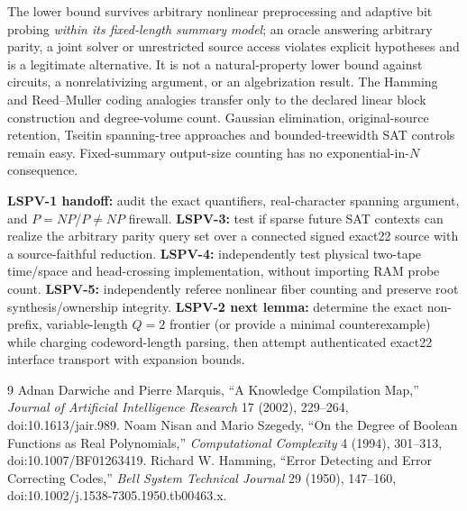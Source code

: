 \documentclass[10pt]{article}
\begin{document}
The lower bound survives arbitrary nonlinear preprocessing and adaptive bit probing \emph{within its fixed-length summary model}; an oracle answering arbitrary parity, a joint solver or unrestricted source access violates explicit hypotheses and is a legitimate alternative. It is not a natural-property lower bound against circuits, a nonrelativizing argument, or an algebrization result. The Hamming and Reed--Muller coding analogies transfer only to the declared linear block construction and degree-volume count. Gaussian elimination, original-source retention, Tseitin spanning-tree approaches and bounded-treewidth SAT controls remain easy. Fixed-summary output-size counting has no exponential-in-$N$ consequence.

\noindent\textbf{LSPV-1 handoff:} audit the exact quantifiers, real-character spanning argument, and $P=NP$/$P\ne NP$ firewall. \textbf{LSPV-3:} test if sparse future SAT contexts can realize the arbitrary parity query set over a connected signed exact22 source with a source-faithful reduction. \textbf{LSPV-4:} independently test physical two-tape time/space and head-crossing implementation, without importing RAM probe count. \textbf{LSPV-5:} independently referee nonlinear fiber counting and preserve root synthesis/ownership integrity. \textbf{LSPV-2 next lemma:} determine the exact non-prefix, variable-length $Q=2$ frontier (or provide a minimal counterexample) while charging codeword-length parsing, then attempt authenticated exact22 interface transport with expansion bounds.

\begin{thebibliography}{9}
 Adnan Darwiche and Pierre Marquis, ``A Knowledge Compilation Map,'' \emph{Journal of Artificial Intelligence Research} 17 (2002), 229--264, doi:10.1613/jair.989.
 Noam Nisan and Mario Szegedy, ``On the Degree of Boolean Functions as Real Polynomials,'' \emph{Computational Complexity} 4 (1994), 301--313, doi:10.1007/BF01263419.
 Richard W. Hamming, ``Error Detecting and Error Correcting Codes,'' \emph{Bell System Technical Journal} 29 (1950), 147--160, doi:10.1002/j.1538-7305.1950.tb00463.x.
\end{thebibliography}
\end{document}
